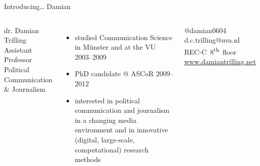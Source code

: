 \documentclass{beamer}
\begin{document}
\begin{frame}{Introducing\ldots}
	{\huge{Damian}}
	\small{}
	\begin{columns}
		dr. Damian Trilling \\
		Assistant Professor Political Communication \& Journalism \\
		\begin{itemize}
			\item studied Communication Science in M\"unster and at the VU 2003--2009
			\item PhD candidate @ ASCoR 2009--2012
			\item interested in political communication and journalism in a changing media environment and in innovative (digital, large-scale, computational) research methods
		\end{itemize}
		@damian0604 ~~ d.c.trilling@uva.nl ~~ REC-C~8\textsuperscript{th}~floor ~~ \url{www.damiantrilling.net} 
	\end{columns}
\end{frame}
\end{document}
